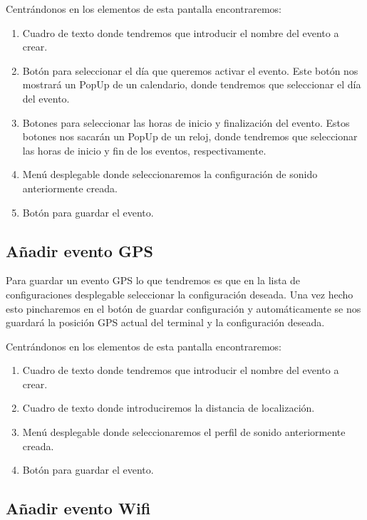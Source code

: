 Centrándonos en los elementos de esta pantalla encontraremos:
\begin{enumerate}
\item Cuadro de texto donde tendremos que introducir el nombre del evento a crear.
\item Botón para seleccionar el día que queremos activar el evento. Este botón nos mostrará un PopUp de un calendario, donde tendremos que seleccionar el día del evento.
\item Botones para seleccionar las horas de inicio y finalización del evento. Estos botones nos sacarán un PopUp de un reloj, donde tendremos que seleccionar las horas de inicio y fin de los eventos, respectivamente.
\item Menú desplegable donde seleccionaremos la configuración de sonido anteriormente creada.
\item Botón para guardar el evento.
\end{enumerate}



\subsection{Añadir evento GPS}

Para guardar un evento GPS lo que tendremos es que en la lista de configuraciones desplegable seleccionar la configuración deseada.
Una vez hecho esto pincharemos en el botón de guardar configuración y automáticamente se nos guardará la posición GPS actual del terminal y la configuración deseada.

Centrándonos en los elementos de esta pantalla encontraremos:
\begin{enumerate}
\item Cuadro de texto donde tendremos que introducir el nombre del evento a crear.
\item Cuadro de texto donde introduciremos la distancia de localización.
\item Menú desplegable donde seleccionaremos el perfil de sonido anteriormente creada.
\item Botón para guardar el evento.
\end{enumerate}


\subsection{Añadir evento Wifi}

